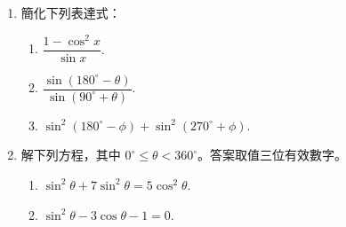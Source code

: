 \documentclass[11pt]{article}
\begin{document}
\begin{enumerate}
        \pagebreak
        \item 簡化下列表達式：\begin{enumerate}
            \item $\dfrac{1-\cos^2{x}}{\sin{x}}$.
            \item $\dfrac{\sin(180^\circ-\theta)}{\sin(90^\circ+\theta)}$.
            \item $\sin^2(180^\circ-\phi)+\sin^2(270^\circ+\phi)$.
        \end{enumerate}

        \hrulefill

            \hrulefill

            \hrulefill
            
            \hrulefill
            
            \hrulefill
            
            \hrulefill
            
            \hrulefill
            
            \hrulefill
            
            \hrulefill
            
            \hrulefill

        \item 解下列方程，其中 $0^\circ\leq \theta< 360^\circ$。答案取值三位有效數字。\begin{enumerate}
            \item $\sin^2{\theta}+7\sin^2{\theta}=5\cos^2{\theta}$.
            \item $\sin^2{\theta}-3\cos{\theta}-1=0$.
        \end{enumerate}

        \hrulefill

        \hrulefill
            
        \hrulefill
        
        \hrulefill
        
        \hrulefill
        
        \hrulefill
        
        \hrulefill
        
        \hrulefill
        
        \hrulefill
        
        \hrulefill
        
        \hrulefill
        
        \hrulefill


\end{enumerate}
\end{document}
